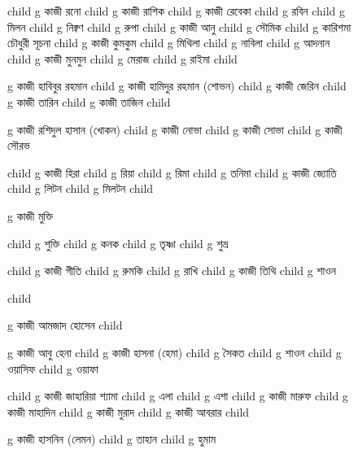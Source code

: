 \documentclass{article}
\begin{document}
\begin{figure}
{\begin{genealogypicture}
{{{{{              child{    g{ কাজী রনো  } child{    g{ কাজী রাশিক  }   }   }
              child{    g{ কাজী রেবেকা } 
                  child{    g{ রবিন }   }
                  child{    g{ মিলন }   }
                  child{    g{ নিক্বণ }   }
                  child{    g{ রুপা }   }
              }
              child{    g{ কাজী আনু  }
                child{ g{  সৌমিক }  }
                child{    g{ কারিশমা চৌধুরী সূচনা }   } 
               }
              child{    g{ কাজী কুমকুম  }
                    child{    g{  মিথিলা }   }
                    child{    g{  নাবিলা }   }
                    child{    g{  আদনান }   }
              }
              child{    g{ কাজী মুনমুন }
                  child{    g{  মেরাজ }   }
                  child{    g{  রাইমা }   }
              }
          }
          child{    g{ কাজী হাবিবুর রহমান }  
              child{    g{ কাজী হামিদুর রহমান (শোভন)  }
                  child{ g{ কাজী জেরিন }  }
                  child{ g{ কাজী তারিন }  }
                  child{ g{ কাজী তাজিন }  }
              }
              child{    g{ কাজী রশিদুল হাসান (খোকন)  }
              child{ g{ কাজী নোভা }  }
              child{ g{ কাজী সোভা }  }
              child{ g{ কাজী সৌরভ }  }

              }
              child{ g{ কাজী হিরা } 
              child{ g{ রিয়া }  }
              child{ g{ রিমা  }  }
              child{ g{ তনিমা }  }
              }
              child{ g{ কাজী জ্যোতি } 
              child{ g{ লিটন }  }
              child{ g{ মিলটন }  }
              }
              child{ g{ কাজী মুক্তি }
                
                child{ g{ শুক্তি }  }
                child{ g{ কনক }  }
                child{ g{ তৃষ্ণা }  }
                child{ g{ শুভ্র }  }
              }
              child{ g{ কাজী গীতি } 
              child{ g{ রুমকি }  }
              child{ g{ রাখি }  }
              }
              child{ g{ কাজী তিথি }
                child{ g{ শাওন }  }
              }
          }
          child{    g{ কাজী আমজাদ হোসেন } 
          child{    g{ কাজী আবু হেনা }
          child{ g{ কাজী হাসনা (হেমা) } 
              child{ g{ সৈকত  }  }
              child{ g{ শাওন  }  }
              child{ g{ ওয়াসিফ  }  }
              child{ g{ ওয়াফা }  }
          }

            child{ g{ কাজী জাহারিয়া শ্যামা  } 
                child{ g{ এলা  }  }
                child{ g{ এশা  }  }
            }
            child{ g{ কাজী মারুফ  }
                child{ g{ কাজী মাহাদিন }  }
              }
            child{ g{ কাজী মুরাদ }
                child{ g{ কাজী আবরার }  }
              }
            child{ g{ কাজী হাসনিন (লেমন) }
            child{ g{ তাহান }  }  
            child{ g{ হুমাম  }  }
              
}}}}}}}
\end{genealogypicture}}
\end{figure}
\end{document}

